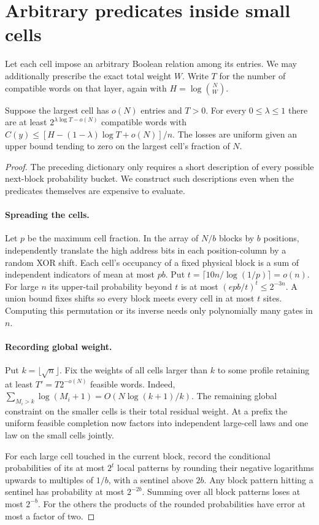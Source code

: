 \section{Arbitrary predicates inside small cells}
Let each cell impose an arbitrary Boolean relation among its entries. We may additionally prescribe the exact total weight $W$. Write $T$ for the number of compatible words on that layer, again with $H=\log\binom NW$.
\begin{theorem}\label{th:relations}
Suppose the largest cell has $o(N)$ entries and $T>0$. For every $0\le\lambda\le1$ there are at least $2^{\lambda\log T-o(N)}$ compatible words with $C(y)\le [H-(1-\lambda)\log T+o(N)]/n$. The losses are uniform given an upper bound tending to zero on the largest cell's fraction of $N$.
\end{theorem}
\begin{proof}
The preceding dictionary only requires a short description of every possible next-block probability bucket. We construct such descriptions even when the predicates themselves are expensive to evaluate.

\paragraph{Spreading the cells.} Let $p$ be the maximum cell fraction. In the array of $N/b$ blocks by $b$ positions, independently translate the high address bits in each position-column by a random XOR shift. Each cell's occupancy of a fixed physical block is a sum of independent indicators of mean at most $pb$. Put $t=\lceil10 n/\log(1/p)\rceil=o(n)$. For large $n$ its upper-tail probability beyond $t$ is at most $(epb/t)^t\le2^{-3n}$. A union bound fixes shifts so every block meets every cell in at most $t$ sites. Computing this permutation or its inverse needs only polynomially many gates in $n$.

\paragraph{Recording global weight.} Put $k=\lfloor\sqrt n\rfloor$. Fix the weights of all cells larger than $k$ to some profile retaining at least $T'=T2^{-o(N)}$ feasible words. Indeed, $\sum_{M_i>k}\log(M_i+1)=O(N\log(k+1)/k)$. The remaining global constraint on the smaller cells is their total residual weight. At a prefix the uniform feasible completion now factors into independent large-cell laws and one law on the small cells jointly.

For each large cell touched in the current block, record the conditional probabilities of its at most $2^t$ local patterns by rounding their negative logarithms upwards to multiples of $1/b$, with a sentinel above $2b$. Any block pattern hitting a sentinel has probability at most $2^{-2b}$. Summing over all block patterns loses at most $2^{-b}$. For the others the products of the rounded probabilities have error at most a factor of two.


\end{proof}
